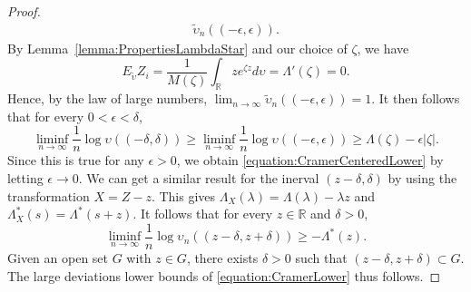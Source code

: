 \begin{proof}
\begin{equation*}
\begin{split}
\tilde{\upsilon}_n ((- \epsilon, \epsilon)) .
\end{split}
\end{equation*}
By Lemma~\ref{lemma:PropertiesLambdaStar} and our choice of $\zeta$, we have
\begin{equation*}
E_{\tilde{\upsilon}} Z_i = \frac{1}{M(\zeta)} \int_{\mathbb{R}} z e^{\zeta z} d\upsilon
= \Lambda'(\zeta) = 0 .
\end{equation*}
Hence, by the law of large numbers, $\lim_{n \rightarrow \infty} \tilde{\upsilon}_n ((- \epsilon, \epsilon)) = 1$.
It then follows that for every $0 < \epsilon < \delta$,
\begin{equation*}
\liminf_{n \rightarrow \infty} \frac{1}{n} \log \upsilon ((- \delta, \delta))
\geq \liminf_{n \rightarrow \infty} \frac{1}{n} \log \upsilon ((- \epsilon, \epsilon))
\ge \Lambda (\zeta) - \epsilon | \zeta | .
\end{equation*}
Since this is true for any $\epsilon > 0$, we obtain \eqref{equation:CramerCenteredLower} by letting $\epsilon \rightarrow 0$.
We can get a similar result for the inerval $(z - \delta, \delta)$ by using the transformation $X = Z - z$.
This gives $\Lambda_X (\lambda) = \Lambda(\lambda) - \lambda z$ and $\Lambda_X^* (s) = \Lambda^*(s+z)$.
It follows that for every $z \in \mathbb{R}$ and $\delta > 0$,
\begin{equation*}
\liminf_{n \rightarrow \infty} \frac{1}{n} \log \upsilon_n (( z - \delta, z + \delta))
\geq - \Lambda^* (z) .
\end{equation*}
Given an open set $G$ with $z \in G$, there exists $\delta > 0$ such that $(z - \delta, z + \delta  ) \subset G$.
The large deviations lower bounds of \eqref{equation:CramerLower} thus follows.


\end{proof}
